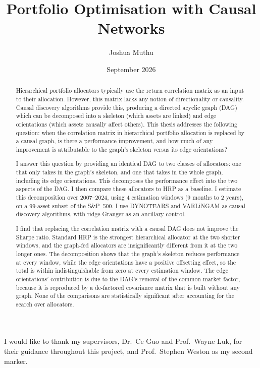 \documentclass[11pt, a4paper]{report}
\title{Portfolio Optimisation with Causal Networks}
\author{Joshua Muthu}
\date{September 2026}
\begin{document}

\maketitle

\begin{abstract}
\noindent Hierarchical portfolio allocators typically use 
the return correlation matrix as an input to their allocation. 
However, this matrix lacks any notion of directionality or causality.
Causal discovery algorithms provide this, producing
a directed acyclic graph (DAG) which can be decomposed into a skeleton
(which assets are linked) and edge orientations
(which assets causally affect others).
This thesis addresses the following question: when the
correlation matrix in hierarchical portfolio allocation is
replaced by a causal graph, is there a performance
improvement, and how much of any improvement is attributable
to the graph's skeleton versus its edge orientations?

I answer this question by providing an identical DAG to
two classes of allocators: one that only takes in the graph's
skeleton, and one that takes in the whole graph, including its
edge orientations. This decomposes the performance effect into
the two aspects of the DAG. I then compare these allocators
to HRP as a baseline. I estimate this decomposition over 
2007--2024, using 4 estimation windows 
(9 months to 2 years), on a 99-asset subset of the S\&P~500. 
I use DYNOTEARS and VARLiNGAM as causal discovery algorithms,
with ridge-Granger as an ancillary control.

I find that replacing the correlation matrix with a causal DAG
does not improve the Sharpe ratio. Standard HRP is the strongest hierarchical allocator at
the two shorter windows, and the graph-fed allocators are insignificantly different from it at the two longer ones. The decomposition shows that the graph's skeleton reduces performance at
every window, while the edge orientations
have a positive offsetting effect, so the total is within
indistinguishable from zero at every estimation window. The edge orientations' contribution is due to the DAG's
removal of the common market factor, because it is reproduced by a de-factored covariance matrix that is built without any graph. None of the comparisons are statistically significant after accounting for the search over allocators.
\end{abstract}

\begin{acknowledgements}
I would like to thank my supervisors, Dr.\ Ce Guo and Prof.\ Wayne Luk, for
their guidance throughout this project, and Prof.\ Stephen Weston as my second
marker.
\end{acknowledgements}
\end{document}
